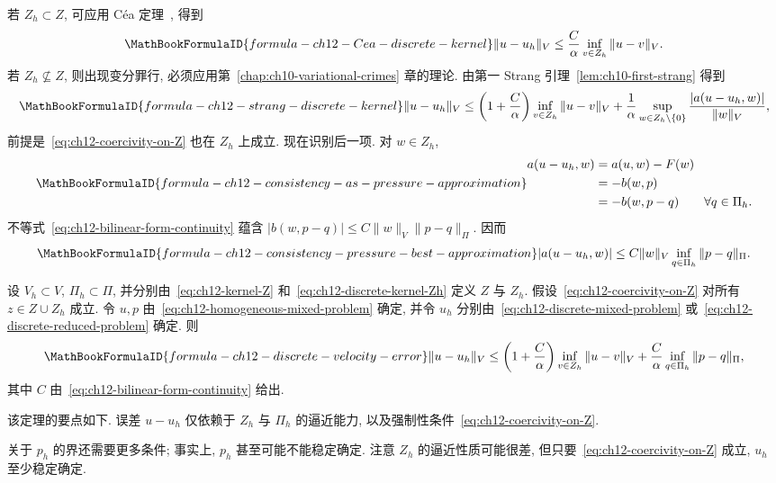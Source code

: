 若 $Z_h\subset Z$, 可应用 Céa 定理~, 得到
\begin{equation}
\MathBookFormulaID{formula-ch12-Cea-discrete-kernel}
\label{eq:ch12-Cea-discrete-kernel}
\|u-u_h\|_V\leq\frac C\alpha
\inf_{v\in Z_h}\|u-v\|_V.
\end{equation}
若 $Z_h\nsubseteq Z$, 则出现变分罪行, 必须应用第~\ref{chap:ch10-variational-crimes} 章的理论. 由第一 Strang 引理~\ref{lem:ch10-first-strang} 得到
\[
\MathBookFormulaID{formula-ch12-strang-discrete-kernel}
\|u-u_h\|_V\leq
\left(1+\frac C\alpha\right)\inf_{v\in Z_h}\|u-v\|_V
+\frac1\alpha\sup_{w\in Z_h\setminus\{0\}}
\frac{|a(u-u_h,w)|}{\|w\|_V},
\]
前提是~\eqref{eq:ch12-coercivity-on-Z} 也在 $Z_h$ 上成立. 现在识别后一项. 对 $w\in Z_h$,
\begin{equation}
\MathBookFormulaID{formula-ch12-consistency-as-pressure-approximation}
\label{eq:ch12-consistency-as-pressure-approximation}
\begin{aligned}
a(u-u_h,w)
&=a(u,w)-F(w)\\
&=-b(w,p)\\
&=-b(w,p-q)\qquad\forall q\in\Pi_h.
\end{aligned}
\end{equation}
不等式~\eqref{eq:ch12-bilinear-form-continuity} 蕴含
$|b(w,p-q)|\leq C\|w\|_V\|p-q\|_\Pi$. 因而
\[
\MathBookFormulaID{formula-ch12-consistency-pressure-best-approximation}
|a(u-u_h,w)|\leq C\|w\|_V
\inf_{q\in\Pi_h}\|p-q\|_\Pi.
\]

\begin{Theorem}
\label{thm:ch12-discrete-velocity-error}
设 $V_h\subset V$, $\Pi_h\subset\Pi$, 并分别由~\eqref{eq:ch12-kernel-Z} 和~\eqref{eq:ch12-discrete-kernel-Zh} 定义 $Z$ 与 $Z_h$. 假设~\eqref{eq:ch12-coercivity-on-Z} 对所有 $z\in Z\cup Z_h$ 成立. 令 $u,p$ 由~\eqref{eq:ch12-homogeneous-mixed-problem} 确定, 并令 $u_h$ 分别由~\eqref{eq:ch12-discrete-mixed-problem} 或~\eqref{eq:ch12-discrete-reduced-problem} 确定. 则
\[
\MathBookFormulaID{formula-ch12-discrete-velocity-error}
\|u-u_h\|_V
\leq\left(1+\frac C\alpha\right)\inf_{v\in Z_h}\|u-v\|_V
+\frac C\alpha\inf_{q\in\Pi_h}\|p-q\|_\Pi,
\]
其中 $C$ 由~\eqref{eq:ch12-bilinear-form-continuity} 给出.
\end{Theorem}

该定理的要点如下. 误差 $u-u_h$ 仅依赖于 $Z_h$ 与 $\Pi_h$ 的逼近能力, 以及强制性条件~\eqref{eq:ch12-coercivity-on-Z}.

关于 $p_h$ 的界还需要更多条件; 事实上, $p_h$ 甚至可能不能稳定确定. 注意 $Z_h$ 的逼近性质可能很差, 但只要~\eqref{eq:ch12-coercivity-on-Z} 成立, $u_h$ 至少稳定确定.
